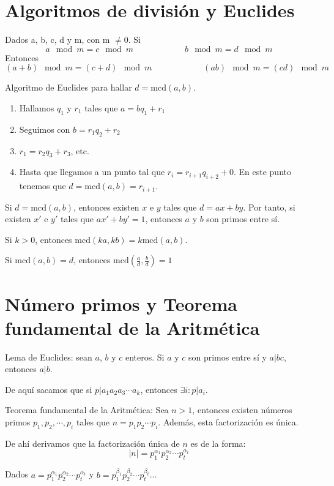 \documentclass[a4paper]{article}
\begin{document}
\section*{Algoritmos de división y Euclides}
Dados a, b, c, d y m, con m $\neq$0. Si
$$a \mod m = c \mod m   \qquad\qquad\qquad  b \mod m = d \mod m$$
Entonces
$$(a+b)\mod m = (c+d) \mod m  \qquad\qquad\qquad (ab)\mod m = (cd) \mod m $$
\hrulefill

Algoritmo de Euclides para hallar $d=\text{mcd}(a,b)$.
\begin{enumerate}
	\item Hallamos $q_1$ y $r_1$ tales que $a = bq_1+r_1$
	\item Seguimos con $b = r_1q_2+r_2$
	\item $r_1 = r_2q_3+r_3$, etc.
	\item Hasta que llegamos a un punto tal que $r_i = r_{i+1}q_{i+2} + 0$. En este punto tenemos que $d = \text{mcd}(a,b) = r_{i+1}$.
\end{enumerate}
\hrulefill

Si $d = \text{mcd}(a,b)$, entonces existen $x$ e $y$ tales que $d = ax+by$. Por tanto, si existen $x'$ e $y'$ tales que $ax'+by'=1$, entonces $a$ y $b$ son primos entre sí.

\hrulefill

Si $k>0$, entonces $\text{mcd}(ka,kb) = k \text{mcd}(a,b)$.

\hrulefill	

Si 	$\text{mcd}(a,b) = d$, entonces $\text{mcd}(\frac{a}{d},\frac{b}{d}) = 1$

\section*{Número primos y Teorema fundamental de la Aritmética}
Lema de Euclides: sean $a$, $b$ y $c$ enteros. Si $a$ y $c$ son primos entre sí y $a|bc$, entonces $a|b$.

De aquí sacamos que si $p|a_1a_2a_3\cdots a_k$, entonces $\exists i : p|a_i$.

\hrulefill

Teorema fundamental de la Aritmética: Sea $n>1$, entonces existen números primos $p_1,p_2,\cdots,p_i$ tales que $n=p_1p_2\cdots p_i$. Además, esta factorización es única.

De ahí derivamos que la factorización única de $n$ es de la forma:
$$|n| = p_1^{\alpha_1}p_2^{\alpha_2}\cdots p_t^{\alpha_t}$$

\hrulefill

Dados $a = p_1^{\alpha_1}p_2^{\alpha_2}\cdots p_t^{\alpha_t}$ y $b = p_1^{\beta_1}p_2^{\beta_2}\cdots p_t^{\beta_t}$...
\end{document}
